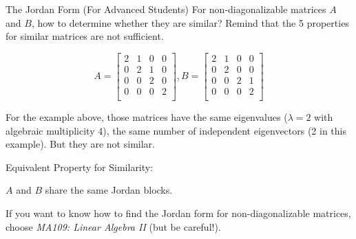 \documentclass{beamer}
\begin{document}
\begin{frame}{The Jordan Form (For Advanced Students)}
For non-diagonalizable matrices $A$ and $B$, how to determine whether they are similar? Remind that the 5 properties for similar matrices are not sufficient.

\begin{equation*}
    A=\left[ \begin{matrix}
        2&		1&		0&		0\\
        0&		2&		1&		0\\
        0&		0&		2&		0\\
        0&		0&		0&		2\\
    \end{matrix} \right] , B=\left[ \begin{matrix}
        2&		1&		0&		0\\
        0&		2&		0&		0\\
        0&		0&		2&		1\\
        0&		0&		0&		2\\
    \end{matrix} \right]
\end{equation*}

For the example above, those matrices have the same eigenvalues ($\lambda =2$ with algebraic multiplicity 4), the same number of independent eigenvectors (2 in this example). But they are not similar.

\vspace{3pt}
Equivalent Property for Similarity:
\begin{center}
    $A$ and $B$ share the same Jordan blocks.
\end{center}

If you want to know how to find the Jordan form for non-diagonalizable matrices, choose \emph{MA109: Linear Algebra II} (but be careful!).


\end{frame}
\end{document}
